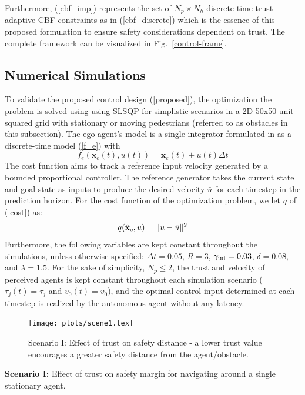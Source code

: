 \documentclass[journal]{IEEEtran}
\begin{document}
Furthermore, (\ref{cbf_imp}) represents the set of $N_p \times N_h$ discrete-time trust-adaptive CBF constraints as in (\ref{cbf_discrete}) which is the essence of this proposed formulation to ensure safety considerations dependent on trust. The complete framework can be visualized in Fig.~\ref{control-frame}.

\subsection{Numerical Simulations}

To validate the proposed control design (\ref{proposed}), the optimization the problem is solved using using SLSQP \cite{kraft1988software} for simplistic scenarios in a 2D 50x50 unit squared grid with stationary or moving pedestrians (referred to as obstacles in this subsection). The ego agent's model is a single integrator formulated in as a discrete-time model (\ref{f_e}) with
\begin{equation}
    f_e(\mathbf{x}_e(t), u(t)) = \mathbf{x}_e(t) + u(t) \Delta t
\end{equation} 
The cost function aims to track a reference input velocity generated by a bounded proportional controller. The reference generator takes the current state and goal state as inputs to produce the desired velocity $\bar{u}$ for each timestep in the prediction horizon. For the cost function of the optimization problem, we let $q$ of (\ref{cost}) as:
\begin{equation}
    q(\hat{\mathbf{x}}_{\rm e}, u) = \|u - \bar{u}\|^2
\end{equation}
Furthermore, the following variables are kept constant throughout the simulations, unless otherwise specified: $\Delta t=0.05$, $R=3$, $\gamma_{\rm ini}=0.03$, $\delta=0.08$, and $\lambda=1.5$. For the sake of simplicity, $N_p \leq 2$, the trust and velocity of perceived agents is kept constant throughout each simulation scenario ($\tau_j(t) = \tau_j$ and $v_0(t) = v_0$), and the optimal control input determined at each timestep is realized by the autonomous agent without any latency.

  \begin{figure}
  \centering
  \texttt{[image: plots/scene1.tex]}
  \caption{Scenario I: Effect of trust on safety distance - a lower trust value encourages a greater safety distance from the agent/obstacle.}
  \label{scene1}
\end{figure}

\textbf{Scenario I:} Effect of trust on safety margin for navigating around a single stationary agent. 
\end{document}
